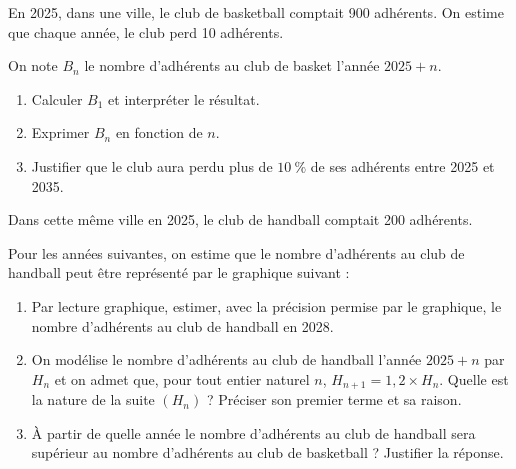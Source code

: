 En 2025, dans une ville, le club de basketball comptait 900 adhérents. On estime que chaque année, le club perd 10 adhérents.
	
	On note $B_{n}$ le nombre d'adhérents au club de basket l'année $2025+n$.
	
	\begin{enumerate}
		\item Calculer $B_{1}$ et interpréter le résultat.
		\item Exprimer $B_{n}$ en fonction de $n$.
		\item Justifier que le club aura perdu plus de $10~\%$ de ses adhérents entre 2025 et 2035.
	\end{enumerate}
	
	Dans cette même ville en 2025, le club de handball comptait 200 adhérents.
	
	Pour les années suivantes, on estime que le nombre d'adhérents au club de handball peut être représenté par le graphique suivant :
	
	\begin{center}
	\end{center}
	
	\begin{enumerate}[start=4]
		\item Par lecture graphique, estimer, avec la précision permise par le graphique, le nombre d'adhérents au club de handball en 2028.
		\item On modélise le nombre d'adhérents au club de handball l'année $2025+n$ par $H_{n}$ et on admet que, pour tout entier naturel $n$, $H_{n+1}=1{,}2\times H_{n}$. Quelle est la nature de la suite $\left(H_{n}\right)$ ? Préciser son premier terme et sa raison.
		\item À partir de quelle année le nombre d'adhérents au club de handball sera supérieur au nombre d'adhérents au club de basketball ? Justifier la réponse.
	\end{enumerate}
